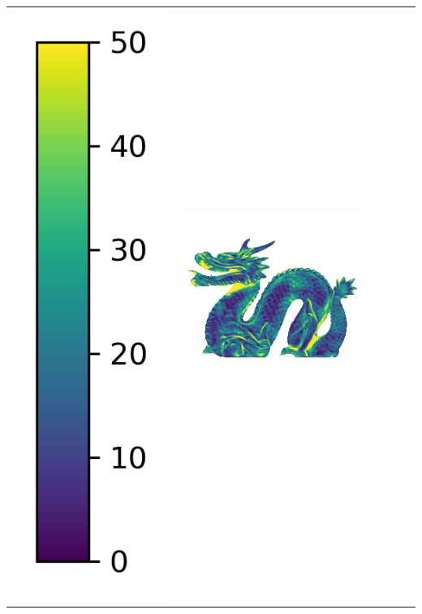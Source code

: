 \begin{tabularx}{\linewidth}{@{}Y@{}Y@{}Y@{}Y@{}Y@{}Y@{}}
\includegraphics[width=0.2\linewidth]{semisynthetic/colorbar_error_vertical.png} &
\includegraphics[width=\linewidth]{semisynthetic/20160617_21_ours_err.png} &

\end{tabularx}
